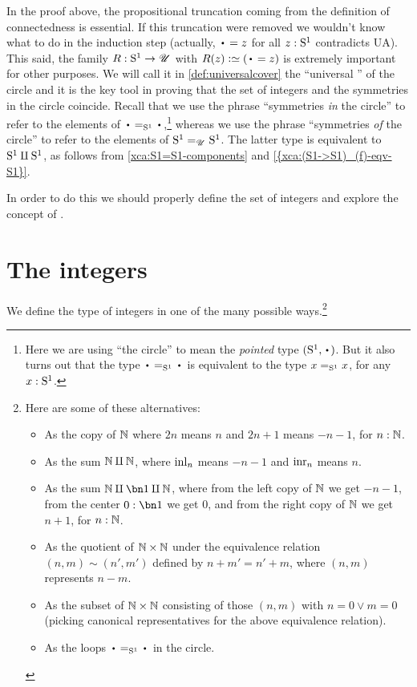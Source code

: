 In the proof above, the propositional truncation coming
from the definition of connectedness is essential.
If this truncation were removed we wouldn't know what to do in
the induction step (actually, ${\base=z}$ for all $z:{\mathrm{S}^1}$ contradicts UA).
This said, the family $R:{\mathrm{S}^1}\to{\mathscr{U}}$ with $R(z)\defequi (\base=z)$ is extremely
important for other purposes. We will call it in \cref{def:universalcover} the
``universal \covering'' of the circle and it is the key tool in proving that
the set of integers and the symmetries in the circle coincide. Recall that we
use the phrase ``symmetries \emph{in} the circle'' to refer to the
elements of $\base=_{\Sc}\base$,\footnote{%
  Here we are using ``the circle'' to mean the
  \emph{pointed} type $(\Sc,\base)$.
  But it also turns out that the type $\base=_{\Sc}\base$ is
  equivalent to the type $x=_{{\mathrm{S}^1}}x$, for any $x:{\mathrm{S}^1}$.}
whereas we use the phrase ``symmetries \emph{of} the circle'' to refer to the elements of ${\mathrm{S}^1}=_{{\mathscr{U}}}{\mathrm{S}^1}$.
The latter type is equivalent to ${\mathrm{S}^1}\amalg{\mathrm{S}^1}$,
as follows from \cref{xca:S1=S1-components} and \cref{{xca:(S1->S1)_(f)-eqv-S1}}.



In order to do this we should properly define the set of integers
and explore the concept of \coverings.

\section{The integers}
\label{sec:integers}

We define the type of integers in one of the many possible ways.\footnote{%
  Here are some of these alternatives:
  \begin{itemize}
  \item As the copy of $\mathbb{N}$ where $2n$ means $n$ and $2n+1$ means $-n-1$, for $n:\mathbb{N}$.
  \item As the sum $\mathbb{N}\amalg\mathbb{N}$, where $\inl{n}$ means $-n-1$ and $\inr{n}$ means $n$.
  \item As the sum $\NN\coprod\bn1\coprod\NN$, where from the left copy of $\mathbb{N}$ we get $-n-1$, from the center $0:\bn1$ we get $0$, and from the right copy of $\mathbb{N}$ we get $n+1$, for $n:\mathbb{N}$.
  \item As the quotient of $\mathbb{N}\times\mathbb{N}$ under the equivalence relation
    $(n,m) \sim (n',m')$ defined by $n+m' = n'+m$,
    where $(n,m)$ represents $n-m$.
  \item As the subset of $\mathbb{N}\times\mathbb{N}$ consisting of those $(n,m)$ with $n=0\lor m=0$ (picking canonical representatives for the above equivalence relation).
  \item As the loops $\base=_\Sc\base$ in the circle. %
  \end{itemize}}

